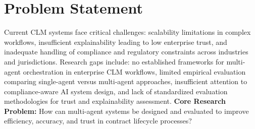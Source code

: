 
\section{Problem Statement}\label{section:problem_statement}

Current CLM systems face critical challenges: scalability limitations in complex workflows, insufficient explainability leading to low enterprise trust, and inadequate handling of compliance and regulatory constraints across industries and jurisdictions.
\newline
\break
Research gaps include: no established frameworks for multi-agent orchestration in enterprise CLM workflows, limited empirical evaluation comparing single-agent versus multi-agent approaches, insufficient attention to compliance-aware AI system design, and lack of standardized evaluation methodologies for trust and explainability assessment.
\newline
\break
\textbf{Core Research Problem:} How can multi-agent systems be designed and evaluated to improve efficiency, accuracy, and trust in contract lifecycle processes?

